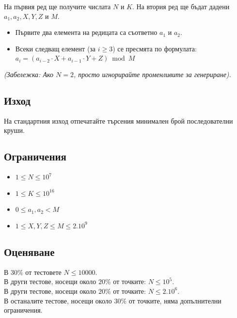 \documentclass[12pt]{article}
\begin{document}
	На първия ред ще получите числата $N$ и $K$. На втория ред ще бъдат дадени $a_1, a_2, X, Y, Z$ и $M$.
	
	\begin{itemize}
		\item Първите два елемента на редицата са съответно $a_1$ и $a_2$.
		\item Всеки следващ елемент (за $i \geq 3$) се пресмята по формулата: 
		$a_i = (a_{i-2} \cdot X + a_{i-1} \cdot Y + Z) \bmod M$
	\end{itemize}
	
	\textit{(Забележка: Ако $N=2$, просто игнорирайте променливите за генериране).}
	
	\subsection{Изход}
	На стандартния изход отпечатайте търсения минимален брой последователни круши.
	
	\subsection{Ограничения}
	\vspace{0.1em}
	\begin{itemize}
		\item $1 \leq N \leq 10^7$
		\item $1 \leq K \leq 10^{16}$
		\item $0 \leq a_1,a_2 < M$
		\item $1 \leq X,Y,Z \leq M \leq 2.10^9$
	\end{itemize}
	
	\subsection{Оценяване}
	\noindent В $30\%$ от тестовете $N \leq 10 000$. \\
	В други тестове, носещи около $20\%$ от точките: $N \leq 10^5$.\\
	В други тестове, носещи около $20\%$ от точките: $N \leq 2.10^6$.\\
	В останалите тестове, носещи около $30\%$ от точките, няма допълнителни
	ограничения.
	
\end{document}
